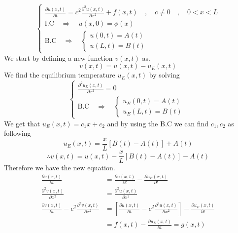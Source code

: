 \documentclass[]{article}
\begin{document}
\begin{equation}
    \begin{cases}
        \displaystyle \frac{\partial u(x,t)}{\partial t} = c^2 \frac{\partial^2 u(x,t)}{\partial x^2} + f(x,t) \quad,\quad c\neq 0 \quad,\quad 0<x<L
        \\
        \text{I.C} \quad \Longrightarrow \quad u(x,0) = \phi(x)
        \\
        \text{B.C} \quad \Longrightarrow \quad
        \begin{cases}
            u(0,t) = A(t)
            \\
            u(L,t) = B(t)        
        \end{cases}  
    \end{cases}
\end{equation}
We start by defining a new function $v(x,t)$ as.
\[
v(x,t) = u(x,t) - u_E(x,t)    
\]
We find the equilibrium temperature $u_E(x,t)$ by solving 
\begin{equation}
    \begin{cases}
        \displaystyle \frac{\partial^2 u_E(x,t)}{\partial x^2}  = 0
        \\
        \text{B.C} \quad \Longrightarrow \quad
            \begin{cases}
                u_E(0,t) = A(t)
                \\
                u_E(L,t) = B(t)        
            \end{cases} 
    \end{cases}
\end{equation}
We get that $u_E(x,t) = c_1 x + c_2$ and by using the B.C we can find $c_1,c_2$ as following
\[
u_E(x,t) = \frac{x}{L}[B(t)-A(t)] +A(t)    
\]
\begin{equation}
\therefore v(x,t) = u(x,t) -  \frac{x}{L}[B(t)-A(t)] -A(t)
\end{equation}
Therefore we have the new equation.
\begin{align*}
\frac{\partial v(x,t)}{\partial t} &= \frac{\partial u(x,t)}{\partial t} - \frac{\partial u_E(x,t)}{\partial t}
\\
\frac{\partial^2 v(x,t)}{\partial x^2} &= \frac{\partial^2 u(x,t)}{\partial x^2}
\\
\frac{\partial v(x,t)}{\partial t} - c^2 \frac{\partial^2 v(x,t)}{\partial x^2} &= \left[ \frac{\partial u(x,t)}{\partial t} - c^2 \frac{\partial^2 u(x,t)}{\partial x^2}\right] - \frac{\partial u_E(x,t)}{\partial t}
\\
&= f(x,t) - \frac{\partial u_E(x,t)}{\partial t} = g(x,t)
\end{align*}
\end{document}
